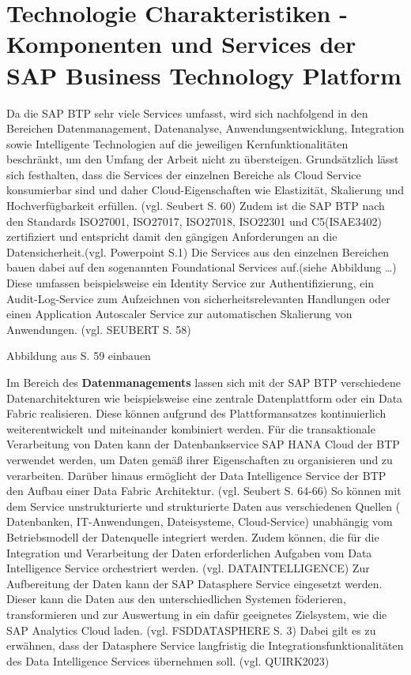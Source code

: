 \section{Technologie Charakteristiken - Komponenten und Services der SAP Business Technology Platform}\label{sec:TechCharak}

Da die SAP BTP sehr viele Services umfasst, wird sich nachfolgend in den Bereichen Datenmanagement, Datenanalyse, Anwendungsentwicklung, Integration sowie Intelligente Technologien auf die jeweiligen Kernfunktionalitäten beschränkt, um den Umfang der Arbeit nicht zu übersteigen. Grundsätzlich lässt sich festhalten, dass die Services der einzelnen Bereiche als Cloud Service konsumierbar sind und daher Cloud-Eigenschaften wie Elastizität, Skalierung und Hochverfügbarkeit erfüllen. (vgl. Seubert S. 60) Zudem ist die SAP BTP nach den Standards ISO27001, ISO27017, ISO27018, ISO22301 und C5(ISAE3402) zertifiziert und entspricht damit den gängigen Anforderungen an die Datensicherheit.(vgl. Powerpoint S.1) Die Services aus den einzelnen Bereichen bauen dabei auf den sogenannten Foundational Services auf.(siehe Abbildung …) Diese umfassen beispielsweise ein Identity Service zur Authentifizierung, ein Audit-Log-Service zum Aufzeichnen von sicherheitsrelevanten Handlungen oder einen Application Autoscaler Service zur automatischen Skalierung von Anwendungen. (vgl. SEUBERT S. 58)

Abbildung aus S. 59 einbauen

Im Bereich des \textbf{Datenmanagements} lassen sich mit der SAP BTP verschiedene Datenarchitekturen wie beispielsweise eine zentrale Datenplattform oder ein Data Fabric realisieren. Diese können aufgrund des Plattformansatzes kontinuierlich weiterentwickelt und miteinander kombiniert werden. Für die transaktionale Verarbeitung von Daten kann der Datenbankservice SAP HANA Cloud der BTP verwendet werden, um Daten gemäß ihrer Eigenschaften zu organisieren und zu verarbeiten. Darüber hinaus ermöglicht der Data Intelligence Service der BTP den Aufbau einer Data Fabric Architektur. (vgl. Seubert S. 64-66) So können mit dem Service unstrukturierte und strukturierte Daten aus verschiedenen Quellen ( Datenbanken, IT-Anwendungen, Dateisysteme, Cloud-Service) unabhängig vom Betriebsmodell der Datenquelle integriert werden. Zudem können, die für die Integration und Verarbeitung der Daten erforderlichen Aufgaben vom Data Intelligence Service orchestriert werden. (vgl. DATAINTELLIGENCE) Zur Aufbereitung der Daten kann der SAP Datasphere Service eingesetzt werden. Dieser kann die Daten aus den unterschiedlichen Systemen föderieren, transformieren und zur Auswertung in ein dafür geeignetes Zielsystem, wie die SAP Analytics Cloud laden. (vgl. FSDDATASPHERE S. 3) Dabei gilt es zu erwähnen, dass der Datasphere Service langfristig die Integrationsfunktionalitäten des Data Intelligence Services übernehmen soll. (vgl. QUIRK2023)

